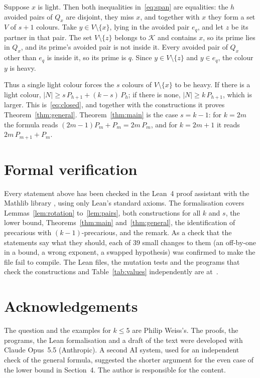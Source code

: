 \documentclass[11pt,a4paper]{article}
\theoremstyle{remark}
\begin{document}
Suppose $x$ is light. Then both inequalities in~\eqref{eq:span} are
equalities: the $h$ avoided pairs of $Q_x$ are disjoint, they miss $x$,
and together with $x$ they form a set $V$ of $s+1$ colours. Take
$y\in V\setminus\{x\}$, lying in the avoided pair $e_q$, and let $z$ be
its partner in that pair. The set $V\setminus\{z\}$ belongs to
$\mathcal K$ and contains $x$, so its prime lies in $Q_x$, and its
prime's avoided pair is not inside it. Every avoided pair of $Q_x$ other
than $e_q$ is inside it, so its prime is $q$. Since $y\in V\setminus\{z\}$ and $y\in e_q$, the colour $y$ is
heavy.

Thus a single light colour forces the $s$ colours of $V\setminus\{x\}$ to
be heavy. If there is a light colour,
$|N|\ge s\,P_{h+1}+(k-s)\,P_h$; if there is none, $|N|\ge
k\,P_{h+1}$, which is larger. This is~\eqref{eq:closed}, and together
with the constructions it proves Theorem~\ref{thm:general}.
Theorem~\ref{thm:main} is the case $s=k-1$: for $k=2m$ the formula reads
$(2m-1)P_m+P_m=2m\,P_m$, and for $k=2m+1$ it reads $2m\,P_{m+1}+P_m$.

\section{Formal verification}

Every statement above has been checked in the Lean~4 proof assistant
\cite{Lean4} with the Mathlib library \cite{Mathlib}, using only Lean's
standard axioms. The formalisation covers Lemmas~\ref{lem:rotation}
to~\ref{lem:pairs}, both constructions for all $k$ and $s$, the lower
bound, Theorems~\ref{thm:main} and~\ref{thm:general}, the identification
of precarious with $(k-1)$-precarious, and the remark. As a check that
the statements say what they should, each of 39 small changes to them
(an off-by-one in a bound, a wrong exponent, a swapped hypothesis) was
confirmed to make the file fail to compile. The Lean files, the
mutation tests and the programs that check the constructions and
Table~\ref{tab:values} independently are at~\cite{repo}.

\section*{Acknowledgements}
The question and the examples for $k\le5$ are Philip Weiss's. The proofs,
the programs, the Lean formalisation and a draft of the text were
developed with Claude Opus~5.5 (Anthropic). A second AI system, used for
an independent check of the general formula, suggested the shorter
argument for the even case of the lower bound in Section~4. The author is
responsible for the content.
\end{document}
